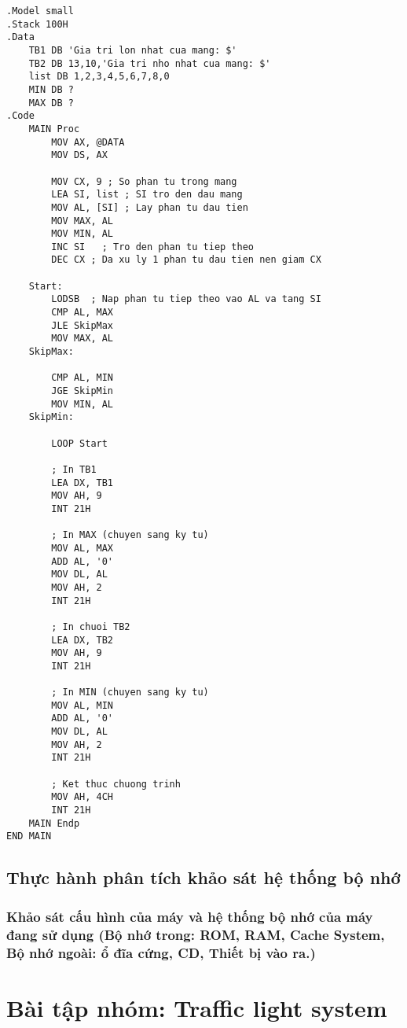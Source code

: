 \documentclass{article}
\begin{document}
\begin{lstlisting}[caption={Tìm giá trị lớn nhất và nhỏ nhất của một mảng số}]
.Model small
.Stack 100H
.Data
    TB1 DB 'Gia tri lon nhat cua mang: $'
    TB2 DB 13,10,'Gia tri nho nhat cua mang: $'                
    list DB 1,2,3,4,5,6,7,8,0
    MIN DB ?
    MAX DB ?   
.Code
    MAIN Proc           
        MOV AX, @DATA
        MOV DS, AX
                   
        MOV CX, 9 ; So phan tu trong mang
        LEA SI, list ; SI tro den dau mang
        MOV AL, [SI] ; Lay phan tu dau tien
        MOV MAX, AL
        MOV MIN, AL
        INC SI   ; Tro den phan tu tiep theo
        DEC CX ; Da xu ly 1 phan tu dau tien nen giam CX
    
    Start:
        LODSB  ; Nap phan tu tiep theo vao AL va tang SI
        CMP AL, MAX
        JLE SkipMax
        MOV MAX, AL
    SkipMax:
    
        CMP AL, MIN
        JGE SkipMin
        MOV MIN, AL
    SkipMin:
    
        LOOP Start
    
        ; In TB1
        LEA DX, TB1
        MOV AH, 9
        INT 21H
    
        ; In MAX (chuyen sang ky tu)
        MOV AL, MAX
        ADD AL, '0'
        MOV DL, AL
        MOV AH, 2
        INT 21H
    
        ; In chuoi TB2
        LEA DX, TB2
        MOV AH, 9
        INT 21H
    
        ; In MIN (chuyen sang ky tu)
        MOV AL, MIN
        ADD AL, '0'
        MOV DL, AL
        MOV AH, 2
        INT 21H
    
        ; Ket thuc chuong trinh
        MOV AH, 4CH
        INT 21H
    MAIN Endp
END MAIN
\end{lstlisting}
\newpage

\subsection{Thực hành phân tích khảo sát hệ thống bộ nhớ}

\subsubsection{ Khảo sát cấu hình của máy và hệ thống bộ nhớ của máy đang sử dụng (Bộ nhớ trong: ROM, RAM, Cache System, Bộ nhớ ngoài: ổ đĩa
cứng, CD, Thiết bị vào ra.)}
\newpage
\section{Bài tập nhóm: Traffic light system}
\end{document}
